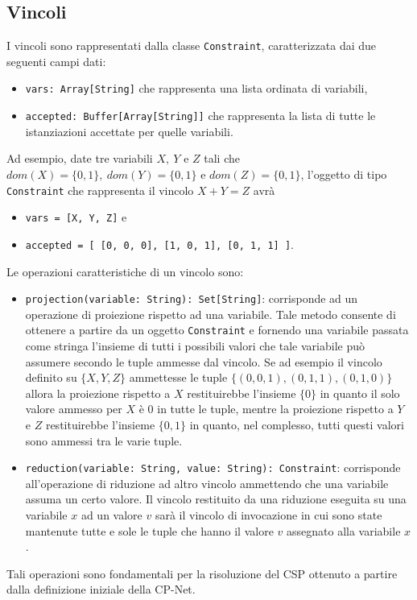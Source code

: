 \subsection{Vincoli}
I vincoli sono rappresentati dalla classe \texttt{Constraint},
caratterizzata dai due seguenti campi dati:
\begin{itemize}
\item \texttt{vars: Array[String]} che rappresenta una lista ordinata
  di variabili,
\item \texttt{accepted: Buffer[Array[String]]} che rappresenta la
  lista di tutte le istanziazioni accettate per quelle variabili.
\end{itemize}


Ad esempio, date tre variabili $X,\ Y$ e $Z$ tali che
$dom(X)=\{0,1\},\ dom(Y)=\{0,1\}$ e $dom(Z)=\{0,1\}$, l'oggetto di
tipo \texttt{Constraint} che rappresenta il vincolo $X+Y=Z$ avrà
\begin{itemize}
\item \texttt{vars = [X, Y, Z]} e
\item \texttt{accepted = [ [0, 0, 0], [1, 0, 1], [0, 1, 1] ]}.
\end{itemize}

Le operazioni caratteristiche di un vincolo sono:
\begin{itemize}
\item \texttt{projection(variable: String): Set[String]}: corrisponde
  ad un operazione di proiezione rispetto ad una variabile. Tale
  metodo consente di ottenere a partire da un oggetto
  \texttt{Constraint} e fornendo una variabile passata come stringa
  l'insieme di tutti i possibili valori che tale variabile può
  assumere secondo le tuple ammesse dal vincolo. Se ad esempio il
  vincolo definito su $\{X,Y,Z\}$ ammettesse le tuple
  $\{(0,0,1),(0,1,1),(0,1,0)\}$ allora la proiezione rispetto a $X$
  restituirebbe l'insieme $\{0\}$ in quanto il solo valore ammesso per
  $X$ è $0$ in tutte le tuple, mentre la proiezione rispetto a $Y$ e
  $Z$ restituirebbe l'insieme $\{0,1\}$ in quanto, nel complesso,
  tutti questi valori sono ammessi tra le varie tuple.
\item \texttt{reduction(variable: String, value: String): Constraint}:
  corrisponde all'operazione di riduzione ad altro vincolo ammettendo
  che una variabile assuma un certo valore. Il vincolo restituito da
  una riduzione eseguita su una variabile $x$ ad un valore $v$ sarà il
  vincolo di invocazione in cui sono state mantenute tutte e sole le
  tuple che hanno il valore $v$ assegnato alla variabile $x$.
\end{itemize}

Tali operazioni sono fondamentali per la risoluzione del CSP ottenuto
a partire dalla definizione iniziale della CP-Net.
